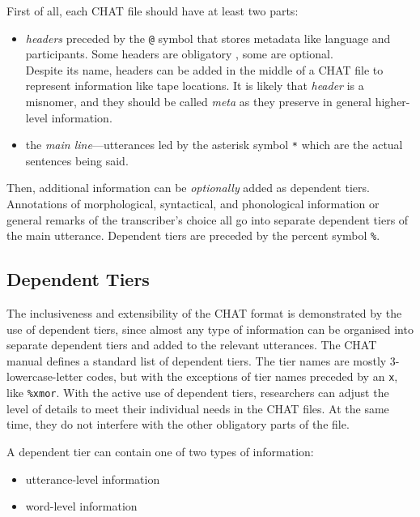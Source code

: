 First of all, each CHAT file should have at least two parts:
\begin{itemize}
	\item \emph{headers} preceded by the \texttt{@} symbol that stores metadata like language and participants. Some headers are obligatory , some are optional.\\
	Despite its name, headers can be added in the middle of a CHAT file to represent information like tape locations. It is likely that \emph{header} is a misnomer, and they should be called \emph{meta} as they preserve in general higher-level information.
	\item the \emph{main line}---utterances led by the asterisk symbol \texttt{*} which are the actual sentences being said.\\
\end{itemize}

Then, additional information can be \emph{optionally} added as dependent tiers. Annotations of morphological, syntactical, and phonological information or general remarks of the transcriber's choice all go into separate dependent tiers of the main utterance. Dependent tiers are preceded by the percent symbol \texttt{\%}.

\subsection{Dependent Tiers}
The inclusiveness and extensibility of the CHAT format is demonstrated by the use of dependent tiers, since almost any type of information can be organised into separate dependent tiers and added to the relevant utterances. The CHAT manual defines a standard list of dependent tiers. The tier names are mostly 3-lowercase-letter codes, but with the exceptions of tier names preceded by an \texttt{x}, like \texttt{\%xmor}. With the active use of dependent tiers, researchers can adjust the level of details to meet their individual needs in the CHAT files. At the same time, they do not interfere with the other obligatory parts of the file.

A dependent tier can contain one of two types of information:
\begin{itemize}
	\item utterance-level information
	\item word-level information
\end{itemize}

